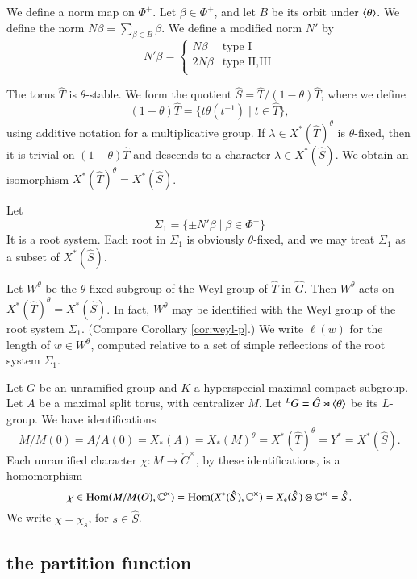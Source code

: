 We define a norm map on $\Phi^+$.  Let $\beta\in\Phi^+$, and let $B$ be its orbit under $\langle{\theta}\rangle$.
We define the norm $N\beta = \sum_{\beta\in B} \beta$. We define a modified norm $N'$ by
\[
N'\beta = \begin{cases} 
N\beta & \text{type I}\\
2N\beta & \text{type II,III}\\
\end{cases}
\]

The torus $\hat T$ is $\theta$-stable.  We form the quotient 
$\hat S = \hat T/(1-\theta) \hat T$, where we define
\[
(1-\theta)\hat T = \{ t\theta(t^{-1}) \mid t\in \hat T\},
\]
using additive notation for a multiplicative group.
If $\lambda\in X^*(\hat T)^\theta$ is $\theta$-fixed, then
it is trivial on $(1-\theta)\hat T$ and descends to a character $\lambda\in X^*(\hat S)$.
We obtain an isomorphism $X^*(\hat T)^\theta = X^*(\hat S)$.

Let 
\[
\Sigma_1 = \{\pm N'\beta\mid \beta\in \Phi^+\}
\]
It is a root system.  Each root in $\Sigma_1$ is obviously $\theta$-fixed, and we
may treat $\Sigma_1$ as a subset of  $X^*(\hat S)$.

Let $W^\theta$ be the $\theta$-fixed subgroup of the Weyl group of $\hat T$ in $\hat G$.  
  Then $W^\theta$ acts on $X^*(\hat T)^\theta = X^*(\hat S)$.  In fact, $W^\theta$ may be
identified with the Weyl group of the root system $\Sigma_1$. (Compare Corollary \ref{cor:weyl-p}.)
We write $\ell(w)$ for the length of $w\in W^\theta$, computed relative to a set of simple reflections of the root system $\Sigma_1$.

Let $G$ be an unramified group and $K$ a hyperspecial maximal compact subgroup.  Let $A$ be a maximal split torus,
with centralizer $M$.  Let ${}^LG = \hat G \rtimes \langle{\theta}\rangle$ be its $L$-group.
We have identifications
\begin{equation}\label{eqn:identify}
M/M(0)=A/A(0)=X_*(A)=X_*(M)^\theta  =X^*(\hat T)^\theta = Y^* = X^*(\hat S).
\end{equation}
Each unramified character $\chi:M\to \ring{C}^\times$, by these identifications, is a homomorphism
\[
\chi\in{\operatorname{Hom}}(M/M(O),\mathbb{C}^\times) = {\operatorname{Hom}}(X^*(\hat S),\mathbb{C}^\times) = X_*(\hat S)\otimes \mathbb{C}^\times = \hat S.
\]
We write $\chi = \chi_s$, for $s\in\hat S$.





\subsection{the partition function}



